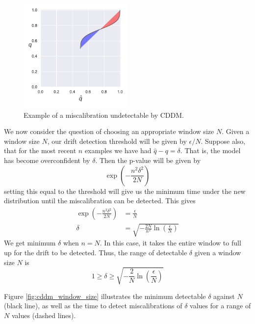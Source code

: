 \begin{figure}
    \centering
    \includegraphics[width=0.5\textwidth]{images/cddm_area2.pdf}
    \caption{Example of a miscalibration undetectable by CDDM.}
    \label{fig:weird_calibration}
\end{figure}

We now consider the question of choosing an appropriate window size $N$. Given a window size $N$, our drift detection threshold will be given by $\epsilon/N$. Suppose also, that for the most recent $n$ examples we have had $\hat{q}-q=\delta$. That is, the model has become overconfident by $\delta$. Then the p-value will be given by
\begin{equation}
    \exp\left(-\frac{n^2\delta^2}{2N}\right)
\end{equation}
setting this equal to the threshold will give us the minimum time under the new distribution until the miscalibration can be detected. This gives
\begin{align}
    \exp\left(-\frac{n^2\delta^2}{2N}\right) &= \frac{\epsilon}{N} \\
    \delta &= \sqrt{-\frac{2N}{n^2}\ln\left(\frac{\epsilon}{N}\right)}
\end{align}
We get minimum $\delta$ when $n=N$. In this case, it takes the entire window to full up for the drift to be detected. Thus, the range of detectable $\delta$ given a window size $N$ is
\begin{equation}
    1 \ge \delta \ge \sqrt{-\frac{2}{N}\ln\left(\frac{\epsilon}{N}\right)} \label{eq:window_size}
\end{equation}

Figure \ref{fig:cddm_window_size} illustrates the minimum detectable $\delta$ against $N$ (black line), as well as the time to detect miscalibrations of $\delta$ values for a range of $N$ values (dashed lines).

